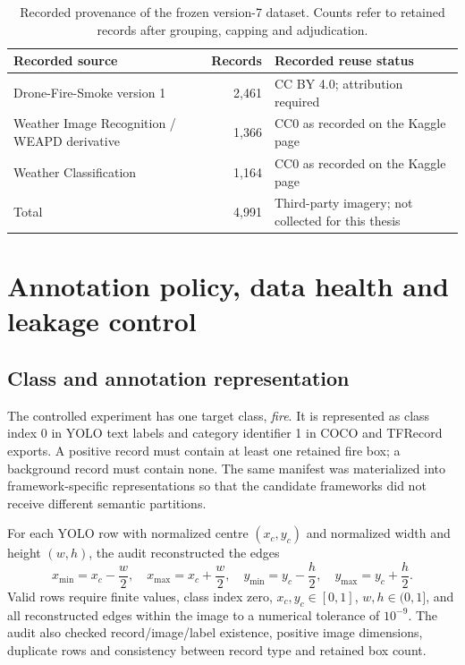 \begin{table}[H]
  \centering
  \caption{Recorded provenance of the frozen version-7 dataset. Counts refer
  to retained records after grouping, capping and adjudication.}
  \label{tab:data-provenance}
  \small
  \begin{tabularx}{\textwidth}{@{}XrX@{}}
    \toprule
    Recorded source & Records & Recorded reuse status \\
    \midrule
    Drone-Fire-Smoke version 1 & 2,461 & CC BY 4.0; attribution required \\
    Weather Image Recognition / WEAPD derivative & 1,366 & CC0 as recorded on the Kaggle page \\
    Weather Classification & 1,164 & CC0 as recorded on the Kaggle page \\
    \midrule
    Total & 4,991 & Third-party imagery; not collected for this thesis \\
    \bottomrule
  \end{tabularx}
\end{table}

\section{Annotation policy, data health and leakage control}
\label{sec:data-models:2}

\subsection{Class and annotation representation}

The controlled experiment has one target class, \emph{fire}. It is represented
as class index 0 in YOLO text labels and category identifier 1 in COCO and
TFRecord exports. A positive record must contain at least one retained fire
box; a background record must contain none. The same manifest was materialized
into framework-specific representations so that the candidate frameworks did
not receive different semantic partitions.

For each YOLO row with normalized centre $(x_c,y_c)$ and normalized width and
height $(w,h)$, the audit reconstructed the edges
\begin{equation}
  x_{\min}=x_c-\frac{w}{2},\quad
  x_{\max}=x_c+\frac{w}{2},\quad
  y_{\min}=y_c-\frac{h}{2},\quad
  y_{\max}=y_c+\frac{h}{2}.
  \label{eq:yolo-box-edges}
\end{equation}
Valid rows require finite values, class index zero, $x_c,y_c\in[0,1]$,
$w,h\in(0,1]$, and all reconstructed edges within the image to a numerical
tolerance of $10^{-9}$. The audit also checked record/image/label existence,
positive image dimensions, duplicate rows and consistency between record type
and retained box count.

